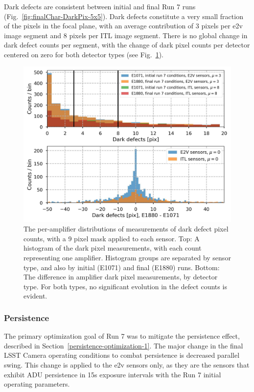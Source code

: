 Dark defects are consistent between initial and final Run 7 runs (Fig.~\ref{fig:finalChar-DarkPix-5x5}). Dark defects constitute a very small fraction of the pixels in the focal plane, with an average contribution of 3 pixels per e2v image segment and 8 pixels per ITL image segment. There is no global change in dark defect counts per segment, with the change of 
dark pixel counts per detector centered on zero for both detector types (see Fig.~\ref{fig:finalChar:darkDefectsComparison}). 

\begin{figure}[ht]
    \centering
    \includegraphics[width=0.9\linewidth]{figures/finalCharacterization/darkDefects_comparison_final.jpg}
    \caption{The per-amplifier distributions of measurements of dark defect pixel counts, with a 9 pixel mask applied to each sensor. Top: A histogram of the dark pixel measurements, with each count representing one amplifier. Histogram groups are separated by sensor type, and also by initial (E1071) and final (E1880) runs. Bottom: The difference in amplifier dark pixel measurements, by detector type. For both types, no significant evolution in the defect counts is evident.}
    \label{fig:finalChar:darkDefectsComparison}
\end{figure}

\clearpage
\subsubsection{Persistence}\label{final-persistence}

The primary optimization goal of Run 7 was to mitigate the persistence effect, described in Section~\ref{persistence-optimization-1}. The major change in the final LSST Camera operating conditions to combat persistence is decreased parallel swing. This change is applied to the e2v sensors only, as they are the sensors that exhibit  ADU persistence in 15s exposure intervals with the Run 7 initial operating parameters.

